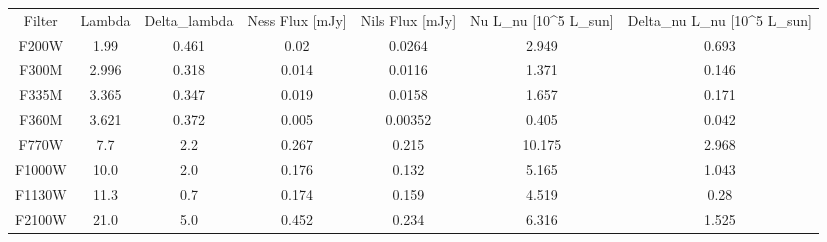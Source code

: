 \begin{table}
\begin{tabular}{ccccccc}
Filter & Lambda & Delta_lambda & Ness Flux [mJy] & Nils Flux [mJy] & Nu L_nu [10^5 L_sun] & Delta_nu L_nu [10^5 L_sun] \\
F200W & 1.99 & 0.461 & 0.02 & 0.0264 & 2.949 & 0.693 \\
F300M & 2.996 & 0.318 & 0.014 & 0.0116 & 1.371 & 0.146 \\
F335M & 3.365 & 0.347 & 0.019 & 0.0158 & 1.657 & 0.171 \\
F360M & 3.621 & 0.372 & 0.005 & 0.00352 & 0.405 & 0.042 \\
F770W & 7.7 & 2.2 & 0.267 & 0.215 & 10.175 & 2.968 \\
F1000W & 10.0 & 2.0 & 0.176 & 0.132 & 5.165 & 1.043 \\
F1130W & 11.3 & 0.7 & 0.174 & 0.159 & 4.519 & 0.28 \\
F2100W & 21.0 & 5.0 & 0.452 & 0.234 & 6.316 & 1.525 \\
\end{tabular}
\end{table}
